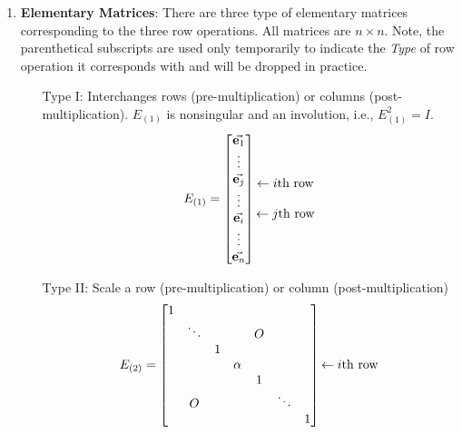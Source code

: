 \begin{enumerate}
\item  \textbf{Elementary Matrices}:  There are three type of elementary matrices corresponding to the three row operations.  All matrices are $n \times n$.  Note, the parenthetical subscripts are used only temporarily to indicate the \textit{Type} of row operation it corresponds with and will be dropped in practice. 

\begin{enumerate}
	\item[Type I:]  Interchanges rows (pre-multiplication) or columns (post-multiplication).  $E_{(1)}$ is nonsingular and an involution, i.e., $E_{(1)}^2 = I$.
	\[ E_{(1)} = 	\begin{bmatrix}   \vec{{\bf e}_1} \\   \vdots \\ \vec{{\bf e}_j} \\ \vdots \\ \vec{{\bf e}_i} \\ \vdots \\ \vec{{\bf e}_n} \end{bmatrix}  \begin{matrix}  \text{ \; }   \\   \text{ \; }   \\     \leftarrow i \text{th row} \\ \text{ \; }  \\ \leftarrow  j \text{th row} \\  \text{ \; }  \\ \text{ \; }  \end{matrix}  \]	
	
	
	\item[Type II:]  Scale a row (pre-multiplication) or column (post-multiplication)
	\[ E_{(2)} = \begin{bmatrix}  1 &  &  &    & & &   \\  &  \ddots & & & O  & & \\ & & 1 & & & &  \\ & & & \alpha & & & \\  & & & & 1 & & \\ & O & & & & \ddots & \\ & & & & & & 1   \end{bmatrix}  \begin{matrix} \text{ \; }   \\   \text{ \; }   \\   \text{ \; }  \\  \leftarrow  i \text{th row}    \\ \text{ \; } \\ \text{ \; }  \\ \text{ \; } \end{matrix}  \]
	

\end{enumerate}
\end{enumerate}
